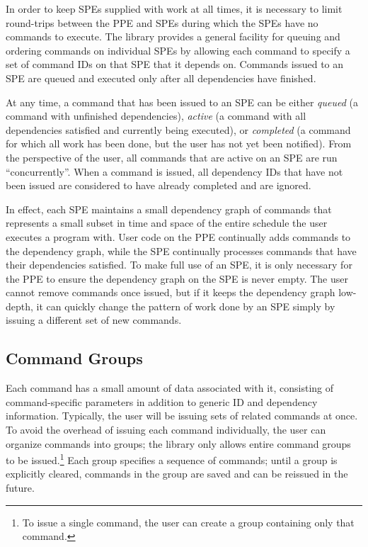 In order to keep SPEs supplied with work at all times, it is necessary to limit round-trips between the PPE and SPEs during which the SPEs have no commands to execute. The library provides a general facility for queuing and ordering commands on individual SPEs by allowing each command to specify a set of command IDs on that SPE that it depends on. Commands issued to an SPE are queued and executed only after all dependencies have finished.

At any time, a command that has been issued to an SPE can be either \emph{queued} (a command with unfinished dependencies), \emph{active} (a command with all dependencies satisfied and currently being executed), or \emph{completed} (a command for which all work has been done, but the user has not yet been notified). From the perspective of the user, all commands that are active on an SPE are run ``concurrently''. When a command is issued, all dependency IDs that have not been issued are considered to have already completed and are ignored.

In effect, each SPE maintains a small dependency graph of commands that represents a small subset in time and space of the entire schedule the user executes a program with. User code on the PPE continually adds commands to the dependency graph, while the SPE continually processes commands that have their dependencies satisfied. To make full use of an SPE, it is only necessary for the PPE to ensure the dependency graph on the SPE is never empty. The user cannot remove commands once issued, but if it keeps the dependency graph low-depth, it can quickly change the pattern of work done by an SPE simply by issuing a different set of new commands.

\subsection{Command Groups}

Each command has a small amount of data associated with it, consisting of command-specific parameters in addition to generic ID and dependency information. Typically, the user will be issuing sets of related commands at once. To avoid the overhead of issuing each command individually, the user can organize commands into groups; the library only allows entire command groups to be issued.\footnote{To issue a single command, the user can create a group containing only that command.} Each group specifies a sequence of commands; until a group is explicitly cleared, commands in the group are saved and can be reissued in the future.

